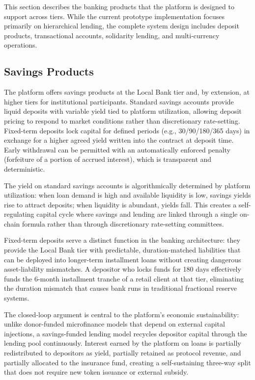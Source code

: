 \documentclass[12pt,a4paper]{report}
\begin{document}
This section describes the banking products that the platform is designed to support across tiers. While the current prototype implementation focuses primarily on hierarchical lending, the complete system design includes deposit products, transactional accounts, solidarity lending, and multi-currency operations.

\subsection{Savings Products}

The platform offers savings products at the Local Bank tier and, by extension, at higher tiers for institutional participants. Standard savings accounts provide liquid deposits with variable yield tied to platform utilization, allowing deposit pricing to respond to market conditions rather than discretionary rate-setting. Fixed-term deposits lock capital for defined periods (e.g., 30/90/180/365 days) in exchange for a higher agreed yield written into the contract at deposit time. Early withdrawal can be permitted with an automatically enforced penalty (forfeiture of a portion of accrued interest), which is transparent and deterministic.

The yield on standard savings accounts is algorithmically determined by platform utilization: when loan demand is high and available liquidity is low, savings yields rise to attract deposits; when liquidity is abundant, yields fall. This creates a self-regulating capital cycle where savings and lending are linked through a single on-chain formula rather than through discretionary rate-setting committees.

Fixed-term deposits serve a distinct function in the banking architecture: they provide the Local Bank tier with predictable, duration-matched liabilities that can be deployed into longer-term installment loans without creating dangerous asset-liability mismatches. A depositor who locks funds for 180 days effectively funds the 6-month installment tranche of a retail client at that tier, eliminating the duration mismatch that causes bank runs in traditional fractional reserve systems.

The closed-loop argument is central to the platform's economic sustainability: unlike donor-funded microfinance models that depend on external capital injections, a savings-funded lending model recycles depositor capital through the lending pool continuously. Interest earned by the platform on loans is partially redistributed to depositors as yield, partially retained as protocol revenue, and partially allocated to the insurance fund, creating a self-sustaining three-way split that does not require new token issuance or external subsidy.
\end{document}
